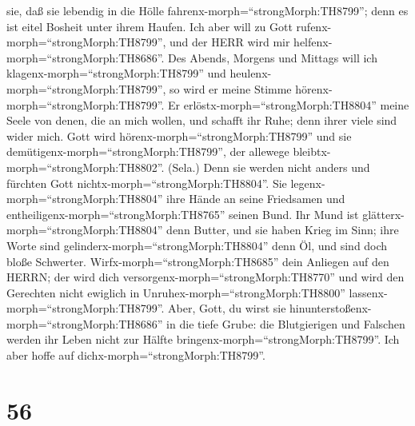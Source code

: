 sie, daß sie lebendig in die Hölle fahrenx-morph=``strongMorph:TH8799'';
denn es ist eitel Bosheit unter ihrem Haufen.  Ich aber
will zu Gott rufenx-morph=``strongMorph:TH8799'', und der HERR wird mir
helfenx-morph=``strongMorph:TH8686''.  Des Abends, Morgens
und Mittags will ich klagenx-morph=``strongMorph:TH8799'' und
heulenx-morph=``strongMorph:TH8799'', so wird er meine Stimme
hörenx-morph=``strongMorph:TH8799''.  Er
erlöstx-morph=``strongMorph:TH8804'' meine Seele von denen, die an mich
wollen, und schafft ihr Ruhe; denn ihrer viele sind wider mich.
 Gott wird hörenx-morph=``strongMorph:TH8799'' und sie
demütigenx-morph=``strongMorph:TH8799'', der allewege
bleibtx-morph=``strongMorph:TH8802''. (Sela.) Denn sie werden nicht
anders und fürchten Gott nichtx-morph=``strongMorph:TH8804''.
 Sie legenx-morph=``strongMorph:TH8804'' ihre Hände an
seine Friedsamen und entheiligenx-morph=``strongMorph:TH8765'' seinen
Bund.  Ihr Mund ist glätterx-morph=``strongMorph:TH8804''
denn Butter, und sie haben Krieg im Sinn; ihre Worte sind
gelinderx-morph=``strongMorph:TH8804'' denn Öl, und sind doch bloße
Schwerter.  Wirfx-morph=``strongMorph:TH8685'' dein
Anliegen auf den HERRN; der wird dich
versorgenx-morph=``strongMorph:TH8770'' und wird den Gerechten nicht
ewiglich in Unruhex-morph=``strongMorph:TH8800''
lassenx-morph=``strongMorph:TH8799''.  Aber, Gott, du wirst
sie hinunterstoßenx-morph=``strongMorph:TH8686'' in die tiefe Grube: die
Blutgierigen und Falschen werden ihr Leben nicht zur Hälfte
bringenx-morph=``strongMorph:TH8799''. Ich aber hoffe auf
dichx-morph=``strongMorph:TH8799''.

\hypertarget{section-55}{%
\section{56}\label{section-55}}

